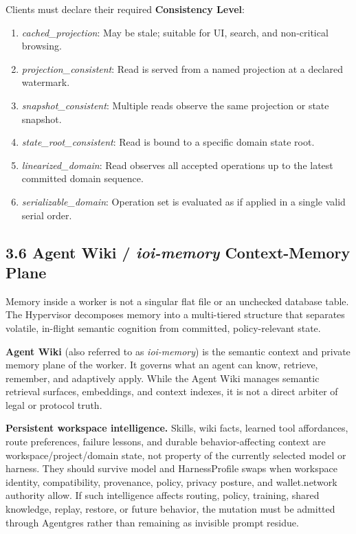 \documentclass[
  11pt,
]{article}
\providecommand{\tightlist}{%
  \setlength{\itemsep}{0pt}\setlength{\parskip}{0pt}}
\begin{document}
Clients must declare their required \textbf{Consistency Level}:

\begin{enumerate}
\def\labelenumi{\arabic{enumi}.}
\tightlist
\item
  \emph{cached\_projection}: May be stale; suitable for UI, search, and
  non-critical browsing.
\item
  \emph{projection\_consistent}: Read is served from a named projection
  at a declared watermark.
\item
  \emph{snapshot\_consistent}: Multiple reads observe the same
  projection or state snapshot.
\item
  \emph{state\_root\_consistent}: Read is bound to a specific domain
  state root.
\item
  \emph{linearized\_domain}: Read observes all accepted operations up to
  the latest committed domain sequence.
\item
  \emph{serializable\_domain}: Operation set is evaluated as if applied
  in a single valid serial order.
\end{enumerate}

\hypertarget{agent-wiki-ioi-memory-context-memory-plane}{%
\subsection{\texorpdfstring{3.6 Agent Wiki / \emph{ioi-memory}
Context-Memory Plane}{3.6 Agent Wiki / ioi-memory Context-Memory Plane}}\label{agent-wiki-ioi-memory-context-memory-plane}}

Memory inside a worker is not a singular flat file or an unchecked
database table. The Hypervisor decomposes memory into a multi-tiered
structure that separates volatile, in-flight semantic cognition from
committed, policy-relevant state.

\textbf{Agent Wiki} (also referred to as \emph{ioi-memory}) is the
semantic context and private memory plane of the worker. It governs what
an agent can know, retrieve, remember, and adaptively apply. While the
Agent Wiki manages semantic retrieval surfaces, embeddings, and context
indexes, it is not a direct arbiter of legal or protocol truth.

\textbf{Persistent workspace intelligence.} Skills, wiki facts, learned
tool affordances, route preferences, failure lessons, and durable
behavior-affecting context are workspace/project/domain state, not
property of the currently selected model or harness. They should survive
model and HarnessProfile swaps when workspace identity, compatibility,
provenance, policy, privacy posture, and wallet.network authority allow.
If such intelligence affects routing, policy, training, shared
knowledge, replay, restore, or future behavior, the mutation must be
admitted through Agentgres rather than remaining as invisible prompt
residue.
\end{document}
